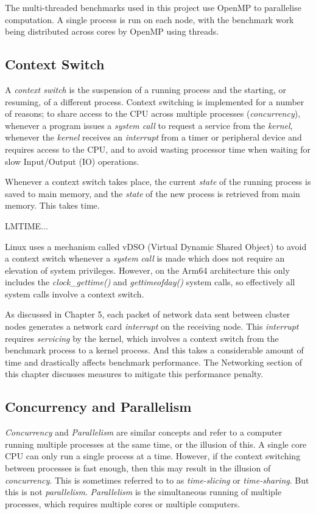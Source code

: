The multi-threaded benchmarks used in this project use OpenMP to parallelise computation. A single process is run on each node, with the benchmark work being distributed across cores by OpenMP using threads. 


\subsection{Context Switch}

A \emph{context switch} is the suspension of a running process and the starting, or resuming, of a different process. Context switching is implemented for a number of reasons; to share access to the CPU across multiple processes (\emph{concurrency}), whenever a program issues a \emph{system call} to request a service from the \emph{kernel}, whenever the \emph{kernel} receives an \emph{interrupt} from a timer or peripheral device and requires access to the CPU, and to avoid wasting processor time when waiting for slow Input/Output (IO) operations.

Whenever a context switch takes place, the current \emph{state} of the running process is saved to main memory, and the \emph{state} of the new process is retrieved from main memory. This takes time.

LMTIME...

Linux uses a mechanism called vDSO (Virtual Dynamic Shared Object) to avoid a context switch whenever a \emph{system call} is made which does not require an elevation of system privileges. However, on the Arm64 architecture this only includes the \emph{clock\_gettime()} and \emph{gettimeofday()} system calls, so effectively all system calls involve a context switch.

As discussed in Chapter 5, each packet of network data sent between cluster nodes generates a network card \emph{interrupt} on the receiving node. This \emph{interrupt} requires \emph{servicing} by the kernel, which involves a context switch from the benchmark process to a kernel process. And this takes a considerable amount of time and drastically affects benchmark performance. The Networking section of this chapter discusses measures to mitigate this performance penalty.

\subsection{Concurrency and Parallelism}

\emph{Concurrency} and \emph{Parallelism} are similar concepts and refer to a computer running multiple processes at the same time, or the illusion of this. A single core CPU can only run a single process at a time. However, if the context switching between processes is fast enough, then this may result in the illusion of \emph{concurrency}. This is sometimes referred to to as \emph{time-slicing} or \emph{time-sharing}. But this is not \emph{parallelism}. \emph{Parallelism} is the simultaneous running of multiple processes, which requires multiple cores or multiple computers.

